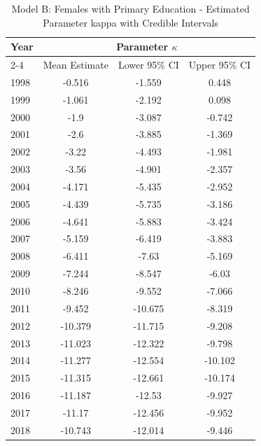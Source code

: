\begin{landscape}
\begin{table}[htbp]
\centering
\caption{Model B: Females with Primary Education - Estimated Parameter kappa  with Credible Intervals}
\label{tab:parameters_k10}
\begin{tabular}{@{}lccc@{}}
\toprule
Year & \multicolumn{3}{c}{Parameter \(\kappa\)} \\
\cmidrule(lr){2-4}
      & Mean Estimate & Lower 95\% CI & Upper 95\% CI \\
\midrule
1998 & -0.516 & -1.559 & 0.448 \\
1999 & -1.061 & -2.192 & 0.098 \\
2000 & -1.9 & -3.087 & -0.742 \\
2001 & -2.6 & -3.885 & -1.369 \\
2002 & -3.22 & -4.493 & -1.981 \\
2003 & -3.56 & -4.901 & -2.357 \\
2004 & -4.171 & -5.435 & -2.952 \\
2005 & -4.439 & -5.735 & -3.186 \\
2006 & -4.641 & -5.883 & -3.424 \\
2007 & -5.159 & -6.419 & -3.883 \\
2008 & -6.411 & -7.63 & -5.169 \\
2009 & -7.244 & -8.547 & -6.03 \\
2010 & -8.246 & -9.552 & -7.066 \\
2011 & -9.452 & -10.675 & -8.319 \\
2012 & -10.379 & -11.715 & -9.208 \\
2013 & -11.023 & -12.322 & -9.798 \\
2014 & -11.277 & -12.554 & -10.102 \\
2015 & -11.315 & -12.661 & -10.174 \\
2016 & -11.187 & -12.53 & -9.927 \\
2017 & -11.17 & -12.456 & -9.952 \\
2018 & -10.743 & -12.014 & -9.446 \\
\bottomrule
\end{tabular}
\end{table}
\end{landscape}